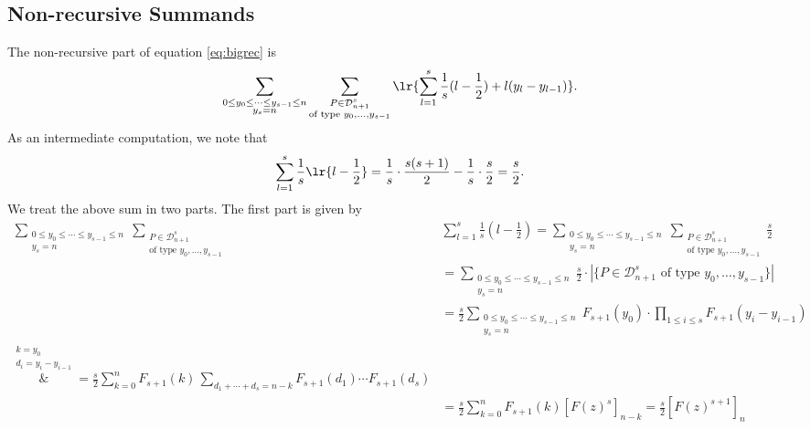 \documentclass[12pt]{article}
\begin{document}
\subsection{Non-recursive Summands}
The non-recursive part of equation \eqref{eq:bigrec} is 
\begin{align*}
  \sum_{\substack{0\leq y_{0}\leq \cdots\leq y_{s-1}\leq n\\y_{s}=n}} \sum_{\substack{P\in \mathcal{D}_{n+1}^{s}\\\text{of type }y_{0},\ldots, y_{s-1}}} \lr{\sum_{l=1}^{s}\frac{1}{s}(l-\frac{1}{2}) +l(y_{l}-y_{l-1})}.
\end{align*}
As an intermediate computation, we note that
\[
  \sum_{l=1}^{s}\frac{1}{s}\lr{l-\frac{1}{2}} = \frac{1}{s}\cdot \frac{s(s+1)}{2}-\frac{1}{s}\cdot\frac{s}{2} = \frac{s}{2}.
\]
We treat the above sum in two parts. The first part is given by
\begin{align*}
  \sum_{\substack{0\leq y_{0}\leq \cdots\leq y_{s-1}\leq n\\y_{s}=n}} \sum_{\substack{P\in \mathcal{D}_{n+1}^{s}\\\text{of type }y_{0},\ldots, y_{s-1}}}& \sum_{l=1}^{s}\frac{1}{s}(l-\frac{1}{2}) = \sum_{\substack{0\leq y_{0}\leq \cdots\leq y_{s-1}\leq n\\y_{s}=n}} \sum_{\substack{P\in \mathcal{D}_{n+1}^{s}\\\text{of type }y_{0},\ldots, y_{s-1}}} \frac{s}{2} \\
  &=  \sum_{\substack{0\leq y_{0}\leq \cdots\leq y_{s-1}\leq n\\y_{s}=n}}  \frac{s}{2} \cdot|\{P\in \mathcal{D}_{n+1}^{s}\text{ of type }y_{0},\ldots, y_{s-1}\}|\\
  &= \frac{s}{2} \sum_{\substack{0\leq y_{0}\leq \cdots\leq y_{s-1}\leq n\\y_{s}=n}}  F_{s+1}(y_{0}) \cdot \prod_{1\leq i \leq s} F_{s+1}(y_{i}-y_{i-1}) \\
  \overset{\substack{k=y_{0}\\ d_{i}=y_{i}-y_{i-1}}}&{=} \frac{s}{2} \sum_{k=0}^{n}F_{s+1}(k)\,\sum_{d_{1}+\cdots+d_{s}=n-k}    F_{s+1}(d_{1})\cdots F_{s+1}(d_{s}) \\
  &= \frac{s}{2} \sum_{k=0}^{n}F_{s+1}(k)[F(z)^{s}]_{n-k} = \frac{s}{2} [F(z)^{s+1}]_{n} \\
\end{align*}
\end{document}
